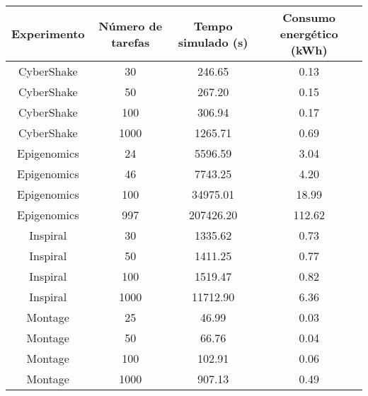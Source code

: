 \begin{table}
	\centering
    \begin{tabular}{|c|c|c|c|}
    \hline
    \textbf{Experimento}           & \textbf{Número de tarefas} & \textbf{Tempo simulado (s)} & \textbf{Consumo energético (kWh)} \\ \hline
    CyberShake                     & 30                & 246.65             & 0.13                     \\
    CyberShake                     & 50                & 267.20             & 0.15                     \\
    CyberShake                     & 100               & 306.94             & 0.17                     \\
    CyberShake                     & 1000              & 1265.71            & 0.69                     \\ \hline
    Epigenomics                    & 24                & 5596.59            & 3.04                     \\
    Epigenomics                    & 46                & 7743.25            & 4.20                     \\
    Epigenomics                    & 100               & 34975.01           & 18.99                    \\
    Epigenomics                    & 997               & 207426.20          & 112.62                   \\ \hline
    Inspiral                       & 30                & 1335.62            & 0.73                     \\
    Inspiral                       & 50                & 1411.25            & 0.77                     \\
    Inspiral                       & 100               & 1519.47            & 0.82                     \\
    Inspiral                       & 1000              & 11712.90           & 6.36                     \\ \hline
    Montage                        & 25                & 46.99              & 0.03                     \\
    Montage                        & 50                & 66.76              & 0.04                     \\
    Montage                        & 100               & 102.91             & 0.06                     \\
    Montage                        & 1000              & 907.13             & 0.49                     \\ \hline

\end{tabular}
\end{table}
